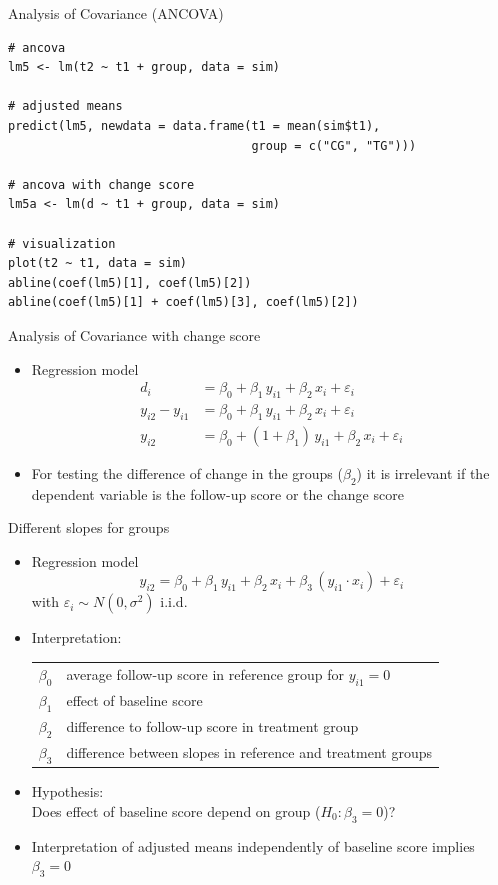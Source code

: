 \documentclass[aspectratio=169]{beamer}
\begin{document}
\begin{frame}[fragile]{Analysis of Covariance (ANCOVA)}
\begin{lstlisting}
# ancova
lm5 <- lm(t2 ~ t1 + group, data = sim)

# adjusted means
predict(lm5, newdata = data.frame(t1 = mean(sim$t1),
                                  group = c("CG", "TG")))

# ancova with change score
lm5a <- lm(d ~ t1 + group, data = sim)

# visualization
plot(t2 ~ t1, data = sim)
abline(coef(lm5)[1], coef(lm5)[2])
abline(coef(lm5)[1] + coef(lm5)[3], coef(lm5)[2])
\end{lstlisting}
\end{frame}

\begin{frame}{Analysis of Covariance with change score}
\begin{itemize}
  \item Regression model
    \begin{align*}
                  d_i &= \beta_0 + \beta_1 \, y_{i1} + \beta_2 \, x_i + \varepsilon_i \\
      y_{i2} - y_{i1} &= \beta_0 + \beta_1 \, y_{i1} + \beta_2 \, x_i + \varepsilon_i \\
               y_{i2} &= \beta_0 + (1 + \beta_1) \, y_{i1} + \beta_2 \, x_i + \varepsilon_i
    \end{align*}
  \item For testing the difference of change in the groups ($\beta_2$) it
    is irrelevant if the dependent variable is the follow-up score or the
    change score
  \vfill
\end{itemize}
\end{frame}

\begin{frame}[<+->]{Different slopes for groups}
\begin{itemize}
  \item Regression model
    \[
      y_{i2} = \beta_0 + \beta_1 \, y_{i1} + \beta_2 \, x_i +
               \beta_3 \, (y_{i1} \cdot x_i) + \varepsilon_i
    \]
    with $\varepsilon_i \sim N(0, \sigma^2)$ i.i.d.
  \item Interpretation:
    \begin{tabular}{lp{10cm}}
    $\beta_0$ & average follow-up score in reference group for $y_{i1} = 0$\\
    $\beta_1$ & effect of baseline score\\
    $\beta_2$ & difference to follow-up score in treatment group\\
    $\beta_3$ & difference between slopes in reference and treatment groups
    \end{tabular}
  \item Hypothesis:\\
        Does effect of baseline score depend on group ($H_0\colon \beta_3 = 0$)?
  \item Interpretation of adjusted means independently of baseline score
    implies $\beta_3 = 0$
\end{itemize}
\end{frame}
\end{document}
